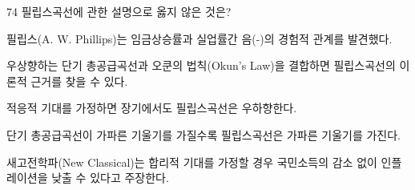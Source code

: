 \begin{question}{74}
필립스곡선에 관한 설명으로 옳지 않은 것은?
\begin{choices}
  \item 필립스(A. W. Phillips)는 임금상승률과 실업률간 음(-)의 경험적 관계를 발견했다.
  \item 우상향하는 단기 총공급곡선과 오쿤의 법칙(Okun's Law)을 결합하면 필립스곡선의 이론적 근거를 찾을 수 있다.
  \item 적응적 기대를 가정하면 장기에서도 필립스곡선은 우하향한다.
  \item 단기 총공급곡선이 가파른 기울기를 가질수록 필립스곡선은 가파른 기울기를 가진다.
  \item 새고전학파(New Classical)는 합리적 기대를 가정할 경우 국민소득의 감소 없이 인플레이션을 낮출 수 있다고 주장한다.
\end{choices}
\end{question}
